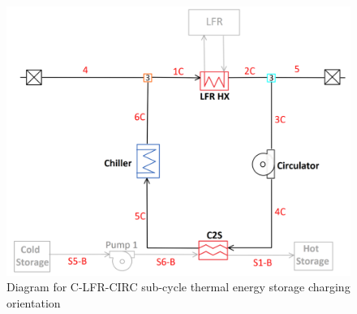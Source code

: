 \begin{figure}[H]
    \widefigure
    \includegraphics[width=10 cm]{Definitions/c-lfr-circ-sub.pdf}
    \caption{Diagram for C-LFR-CIRC sub-cycle thermal energy storage charging orientation\label{c-lfr-circ-sub}}
\end{figure}

